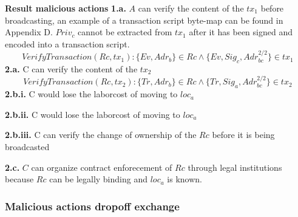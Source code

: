 \bigbreak
\noindent\textbf{Result malicious actions}
\bigbreak
\noindent\textbf{1.a.} $A$ can verify the content of the $tx_1$ before broadcasting, an example of a transaction script byte-map can be found in Appendix D. $Priv_c$ cannot be extracted from $tx_1$ after it has been signed and encoded into a transaction script.
\[VerifyTransaction(Rc, tx_1)\colon \{Ev, Adr_b\} \in Rc \land \{Ev, Sig_c,  Adr_{bc}^{2/2}\} \in tx_1\]
\noindent\textbf{2.a.} C can verify the content of the $tx_2$
\[VerifyTransaction(Rc, tx_2)\colon\{Tr, Adr_b\} \in Rc \land \{Tr, Sig_a, Adr_{bc}^{2/2}\} \in tx_2\]
\noindent\textbf{2.b.i.} C would lose the laborcost of moving to $loc_a$ \par
\noindent\textbf{2.b.ii.} C would lose the laborcost of moving to $loc_a$ \par
\noindent\textbf{2.b.iii.} C can verify the change of ownership of the $Rc$ before it is being broadcasted \par
\noindent\textbf{2.c.} $C$ can organize contract enforecement of $Rc$ through legal institutions because $Rc$ can be legally binding and $loc_a$ is known. \par

\subsubsection{Malicious actions dropoff exchange}

